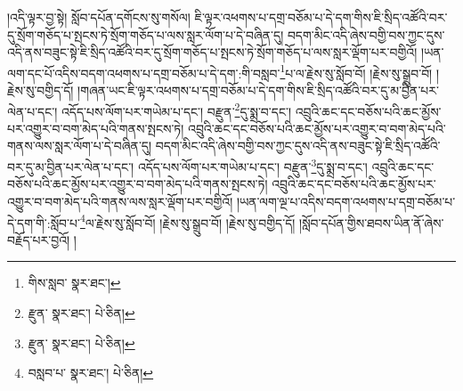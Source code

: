 །འདི་ལྟར་བྱ་སྟེ། སློབ་དཔོན་དགོངས་སུ་གསོལ། ཇི་ལྟར་འཕགས་པ་དགྲ་བཅོམ་པ་དེ་དག་གིས་ཇི་སྲིད་འཚོའི་བར་དུ་སྲོག་གཅོད་པ་སྤངས་ཏེ་སྲོག་གཅོད་པ་ལས་སླར་ལོག་པ་དེ་བཞིན་དུ། བདག་མིང་འདི་ཞེས་བགྱི་བས་ཀྱང་དུས་འདི་ནས་བཟུང་སྟེ་ཇི་སྲིད་འཚོའི་བར་དུ་སྲོག་གཅོད་པ་སྤངས་ཏེ་སྲོག་གཅོད་པ་ལས་སླར་ལྡོག་པར་བགྱིའོ། །ཡན་ལག་དང་པོ་འདིས་བདག་འཕགས་པ་དགྲ་བཅོམ་པ་དེ་དག་:གི་བསླབ་\footnote{གིས་སླབ་  སྣར་ཐང་། }པ་ལ་རྗེས་སུ་སློབ་བོ། །རྗེས་སུ་སྒྲུབ་བོ། །རྗེས་སུ་བགྱིད་དོ། །གཞན་ཡང་ཇི་ལྟར་འཕགས་པ་དགྲ་བཅོམ་པ་དེ་དག་གིས་ཇི་སྲིད་འཚོའི་བར་དུ་མ་བྱིན་པར་ལེན་པ་དང་། འདོད་པས་ལོག་པར་གཡེམ་པ་དང་། བརྫུན་\footnote{རྫུན་  སྣར་ཐང་།  པེ་ཅིན། }དུ་སྨྲ་བ་དང་། འབྲུའི་ཆང་དང་བཅོས་པའི་ཆང་མྱོས་པར་འགྱུར་བ་བག་མེད་པའི་གནས་སྤངས་ཏེ། འབྲུའི་ཆང་དང་བཅོས་པའི་ཆང་མྱོས་པར་འགྱུར་བ་བག་མེད་པའི་གནས་ལས་སླར་ལོག་པ་དེ་བཞིན་དུ། བདག་མིང་འདི་ཞེས་བགྱི་བས་ཀྱང་དུས་འདི་ནས་བཟུང་སྟེ་ཇི་སྲིད་འཚོའི་བར་དུ་མ་བྱིན་པར་ལེན་པ་དང་། འདོད་པས་ལོག་པར་གཡེམ་པ་དང་། བརྫུན་\footnote{རྫུན་  སྣར་ཐང་།  པེ་ཅིན། }དུ་སྨྲ་བ་དང་། འབྲུའི་ཆང་དང་བཅོས་པའི་ཆང་མྱོས་པར་འགྱུར་བ་བག་མེད་པའི་གནས་སྤངས་ཏེ། འབྲུའི་ཆང་དང་བཅོས་པའི་ཆང་མྱོས་པར་འགྱུར་བ་བག་མེད་པའི་གནས་ལས་སླར་ལྡོག་པར་བགྱིའོ། །ཡན་ལག་ལྔ་པ་འདིས་བདག་འཕགས་པ་དགྲ་བཅོམ་པ་དེ་དག་གི་:སློབ་པ་\footnote{བསླབ་པ་  སྣར་ཐང་།  པེ་ཅིན། }ལ་རྗེས་སུ་སློབ་བོ། །རྗེས་སུ་སྒྲུབ་བོ། །རྗེས་སུ་བགྱིད་དོ། །སློབ་དཔོན་གྱིས་ཐབས་ཡིན་ནོ་ཞེས་བརྗོད་པར་བྱའོ། །
